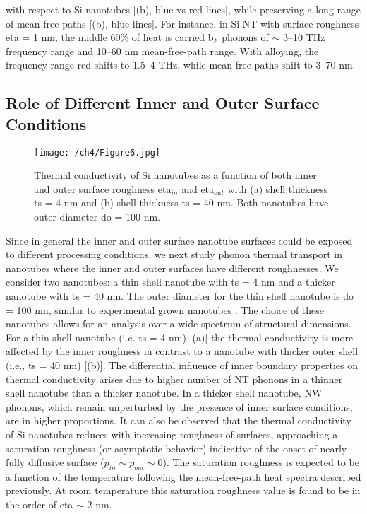 with respect to Si nanotubes [(b), blue vs red lines], while preserving a long range of mean-free-paths [(b), blue lines]. For instance, in Si NT with surface roughness \gls{eta} = 1 nm, the middle 60\% of heat is carried by phonons of $\sim$ 3–10 THz frequency range and 10–60 nm mean-free-path range. With alloying, the frequency range red-shifts to 1.5–4 THz, while mean-free-paths shift to 3–70 nm.


\subsection{Role of Different Inner and Outer Surface Conditions}

\begin{figure}[t!]
	\centering\texttt{[image: /ch4/Figure6.jpg]}
	\caption{Thermal conductivity of Si nanotubes as a function of both inner and outer surface roughness \gls{eta}$_{in}$ and \gls{eta}$_{out}$ with (a) shell thickness \gls{ts} = 4 nm and (b) shell thickness \gls{ts} = 40 nm. Both nanotubes have outer diameter \gls{do} = 100 nm.}
	\label{fig:nt_fig6}
\end{figure}

Since in general the inner and outer surface nanotube surfaces could be exposed to different processing conditions, we next study phonon thermal transport in nanotubes where the inner and outer surfaces have different roughnesses. We consider two nanotubes: a thin shell nanotube with \gls{ts} = 4 nm and a thicker nanotube with \gls{ts} = 40 nm. The outer diameter for the thin shell nanotube is \gls{do} = 100 nm, similar to experimental grown nanotubes \cite{RN436}. The choice of these nanotubes allows for an analysis over a wide spectrum of structural dimensions. For a thin-shell nanotube (i.e. \gls{ts} = 4 nm) [(a)] the thermal conductivity is more affected by the inner roughness in contrast to a nanotube with thicker outer shell (i.e., \gls{ts} = 40 nm) [(b)]. The differential influence of inner boundary properties on thermal conductivity arises due to higher number of NT phonons in a thinner shell nanotube than a thicker nanotube. In a thicker shell nanotube, NW phonons, which remain unperturbed by the presence of inner surface conditions, are in higher proportions. It can also be observed that the thermal conductivity of Si nanotubes reduces with increasing roughness of surfaces, approaching a saturation roughness (or asymptotic behavior) indicative of the onset of nearly fully diffusive surface ($p_{in}\sim p_{out}\sim 0$). The saturation roughness is expected to be a function of the temperature following the mean-free-path heat spectra described previously. At room temperature this saturation roughness value is found to be in the order of \gls{eta} $\sim$ 2 nm. 

